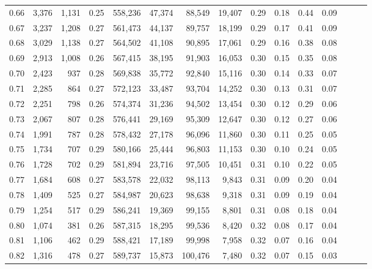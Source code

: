 \begin{tabular}{rrrrrrrrrrrrrrr}
0.66 &   3,376 &  1,131 &  0.25 &  558,236 &   47,374 &   88,549 &   19,407 &  0.29 &  0.18 &  0.44 &      0.09 \\
0.67 &   3,237 &  1,208 &  0.27 &  561,473 &   44,137 &   89,757 &   18,199 &  0.29 &  0.17 &  0.41 &      0.09 \\
0.68 &   3,029 &  1,138 &  0.27 &  564,502 &   41,108 &   90,895 &   17,061 &  0.29 &  0.16 &  0.38 &      0.08 \\
0.69 &   2,913 &  1,008 &  0.26 &  567,415 &   38,195 &   91,903 &   16,053 &  0.30 &  0.15 &  0.35 &      0.08 \\
0.70 &   2,423 &    937 &  0.28 &  569,838 &   35,772 &   92,840 &   15,116 &  0.30 &  0.14 &  0.33 &      0.07 \\
0.71 &   2,285 &    864 &  0.27 &  572,123 &   33,487 &   93,704 &   14,252 &  0.30 &  0.13 &  0.31 &      0.07 \\
0.72 &   2,251 &    798 &  0.26 &  574,374 &   31,236 &   94,502 &   13,454 &  0.30 &  0.12 &  0.29 &      0.06 \\
0.73 &   2,067 &    807 &  0.28 &  576,441 &   29,169 &   95,309 &   12,647 &  0.30 &  0.12 &  0.27 &      0.06 \\
0.74 &   1,991 &    787 &  0.28 &  578,432 &   27,178 &   96,096 &   11,860 &  0.30 &  0.11 &  0.25 &      0.05 \\
0.75 &   1,734 &    707 &  0.29 &  580,166 &   25,444 &   96,803 &   11,153 &  0.30 &  0.10 &  0.24 &      0.05 \\
0.76 &   1,728 &    702 &  0.29 &  581,894 &   23,716 &   97,505 &   10,451 &  0.31 &  0.10 &  0.22 &      0.05 \\
0.77 &   1,684 &    608 &  0.27 &  583,578 &   22,032 &   98,113 &    9,843 &  0.31 &  0.09 &  0.20 &      0.04 \\
0.78 &   1,409 &    525 &  0.27 &  584,987 &   20,623 &   98,638 &    9,318 &  0.31 &  0.09 &  0.19 &      0.04 \\
0.79 &   1,254 &    517 &  0.29 &  586,241 &   19,369 &   99,155 &    8,801 &  0.31 &  0.08 &  0.18 &      0.04 \\
0.80 &   1,074 &    381 &  0.26 &  587,315 &   18,295 &   99,536 &    8,420 &  0.32 &  0.08 &  0.17 &      0.04 \\
0.81 &   1,106 &    462 &  0.29 &  588,421 &   17,189 &   99,998 &    7,958 &  0.32 &  0.07 &  0.16 &      0.04 \\
0.82 &   1,316 &    478 &  0.27 &  589,737 &   15,873 &  100,476 &    7,480 &  0.32 &  0.07 &  0.15 &      0.03 \\

\end{tabular}
